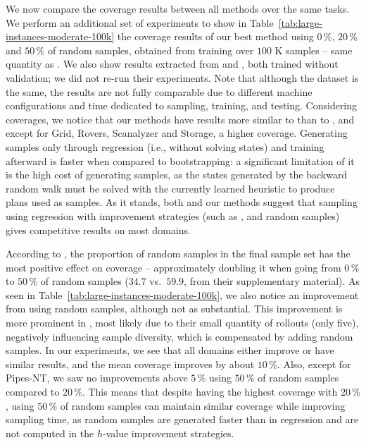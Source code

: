 We now compare the coverage results between all methods over the same tasks. We perform an additional set of experiments to show in Table~\ref{tab:large-instances-moderate-100k} the coverage results of our best method using $0\,\%$, $20\,\%$ and $50\,\%$ of random samples, obtained from training over $100$ K samples -- same quantity as \citeyear{OToole/2022}. We also show results extracted from \citeyear{Ferber.etal/2022} \hboot and \citeyear{OToole/2022} \hnrsl, both trained without validation; we did not re-run their experiments. Note that although the dataset is the same, the results are not fully comparable due to different machine configurations and time dedicated to sampling, training, and testing. Considering coverages, we notice that our methods have results more similar to \hnrsl than to \hboot, and except for Grid, Rovers, Scanalyzer and Storage, a higher coverage. Generating samples only through regression (i.e., without solving states) and training afterward is faster when compared to bootstrapping: a significant limitation of it is the high cost of generating samples, as the states generated by the backward random walk must be solved with the currently learned heuristic to produce plans used as samples.
As it stands, both \hnrsl and our methods suggest that sampling using regression with improvement strategies (such as \hmin, \hvfc and random samples) gives competitive results on most domains.



According to \citeyear{OToole/2022}, the proportion of random samples in the final sample set has the most positive effect on coverage -- approximately doubling it when going from $0\,\%$ to $50\,\%$ of random samples ($34.7$ vs.~$59.9$, from their supplementary material). As seen in Table~\ref{tab:large-instances-moderate-100k}, we also notice an improvement from using random samples, although not as substantial. This improvement is more prominent in \citeyear{OToole/2022}, most likely due to their small quantity of rollouts (only five), negatively influencing sample diversity, which is compensated by adding random samples. In our experiments, we see that all domains either improve or have similar results, and the mean coverage improves by about $10\,\%$. Also, except for Pipes-NT, we saw no improvements above $5\,\%$ using $50\,\%$ of random samples compared to $20\,\%$. This means that despite having the highest coverage with $20\,\%$, using $50\,\%$ of random samples can maintain similar coverage while improving sampling time, as random samples are generated faster than in regression and are not computed in the $h$-value improvement strategies.
